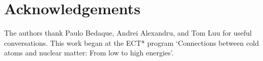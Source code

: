 \section*{Acknowledgements}

The authors thank Paulo Bedaque, Andrei Alexandru, and Tom Luu for useful conversations.
This work began at the ECT* program `Connections between cold atoms and nuclear matter: From low to high energies'.
